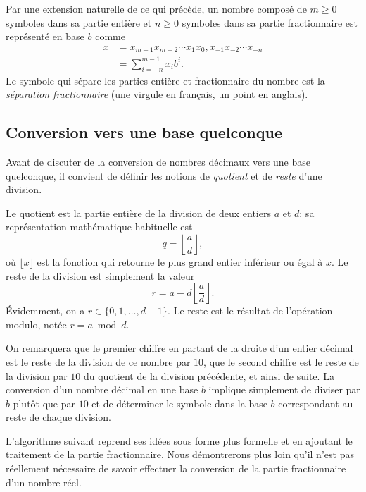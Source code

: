 \documentclass[letterpaper,11pt]{memoir}
\theoremstyle{plain}
\theoremstyle{definition}
\theoremstyle{remark}
\begin{document}
Par une extension naturelle de ce qui précède, un nombre composé de $m
\geq 0$ symboles dans sa partie entière et $n \geq 0$ symboles dans sa
partie fractionnaire est représenté en base $b$ comme
\begin{align*}
  x
  &= x_{m-1}x_{m-2} \cdots x_1x_0,x_{-1}x_{-2} \cdots x_{-n} \\
  &= \sum_{i = -n}^{m - 1} x_i b^i.
\end{align*}
Le symbole qui sépare les parties entière et fractionnaire du nombre
est la \emph{séparation fractionnaire} (une virgule en français, un
point en anglais).


\subsection{Conversion vers une base quelconque}
\label{sec:ordinateurs:conversion:10_vers_b}

Avant de discuter de la conversion de nombres décimaux vers une base
quelconque, il convient de définir les notions de \emph{quotient} et
de \emph{reste} d'une division.

Le quotient est la partie entière de la division de deux entiers $a$
et $d$; sa représentation mathématique habituelle est
\begin{equation}
  \label{eq:ordinateurs:quotient}
  q = \left\lfloor \frac{a}{d} \right\rfloor,
\end{equation}
où $\lfloor x \rfloor$ est la fonction qui retourne le plus grand
entier inférieur ou égal à $x$. Le reste de la division est simplement
la valeur
\begin{equation}
  \label{eq:ordinateurs:remainder}
  r = a - d \left\lfloor \frac{a}{d} \right\rfloor.
\end{equation}
Évidemment, on a $r \in \{0, 1, \dots, d - 1\}$. Le reste est le
résultat de l'opération modulo, notée $r = a \bmod d$.

On remarquera que le premier chiffre en partant de la droite d'un
entier décimal est le reste de la division de ce nombre par $10$, que le
second chiffre est le reste de la division par $10$ du quotient de la
division précédente, et ainsi de suite. La conversion d'un nombre
décimal en une base $b$ implique simplement de diviser par $b$ plutôt
que par $10$ et de déterminer le symbole dans la base $b$ correspondant
au reste de chaque division.

L'algorithme suivant reprend ses idées sous forme plus formelle et en
ajoutant le traitement de la partie fractionnaire. Nous démontrerons
plus loin qu'il n'est pas réellement nécessaire de savoir effectuer la
conversion de la partie fractionnaire d'un nombre réel.
\end{document}
